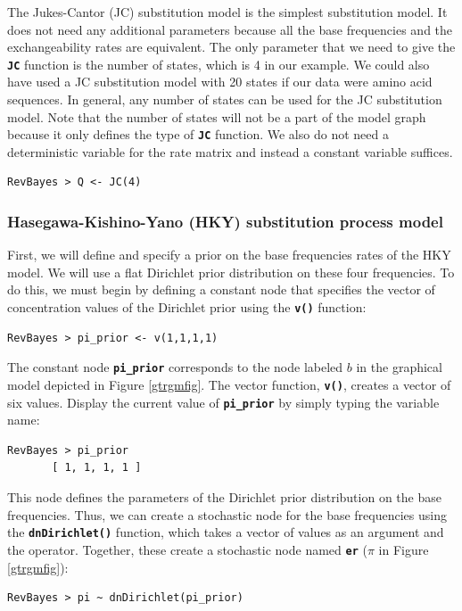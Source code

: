 \documentclass[11pt]{article}
\newcommand{\cl}[1]{{\texttt{\textbf{#1}}}}
\newcommand{\rbdn}{{\Large \symbol{126}}} %
\begin{document}
The Jukes-Cantor (JC) substitution model is the simplest substitution model.
It does not need any additional parameters because all the base frequencies and the exchangeability rates are equivalent.
The only parameter that we need to give the \cl{JC} function is the number of states, which is 4 in our example.
We could also have used a JC substitution model with 20 states if our data were amino acid sequences.
In general, any number of states can be used for the JC substitution model.
Note that the number of states will not be a part of the model graph because it only defines the type of \cl{JC} function.
We also do not need a deterministic variable for the rate matrix and instead a constant variable suffices. 
{\tt \begin{snugshade*}
\begin{lstlisting}
RevBayes > Q <- JC(4)
\end{lstlisting}
\end{snugshade*}}


\subsubsection*{Hasegawa-Kishino-Yano (HKY)  substitution process model}


First, we will define and specify a prior on the base frequencies rates of the HKY model. 
We will use a flat Dirichlet prior distribution on these four frequencies. 
To do this, we must begin by defining a constant node that specifies the vector of concentration values of the Dirichlet prior using the \cl{v()} function:
{\tt \begin{snugshade*}
\begin{lstlisting}
RevBayes > pi_prior <- v(1,1,1,1) 
\end{lstlisting}
\end{snugshade*}}


The constant node \cl{pi\_prior} corresponds to the node labeled $b$ in the graphical model depicted in Figure \ref{gtrgmfig}. 
The vector function, \cl{v()}, creates a vector of six values. 
Display the current value of \cl{pi\_prior} by simply typing the variable name:
{\tt \begin{snugshade*}
\begin{lstlisting}
RevBayes > pi_prior
       [ 1, 1, 1, 1 ]
\end{lstlisting}
\end{snugshade*}}
This node defines the parameters of the Dirichlet prior distribution on the base frequencies.
Thus, we can create a stochastic node for the base frequencies using the \cl{dnDirichlet()} function, which takes a vector of values as an argument and the \cl{\rbdn} operator. 
Together, these create a stochastic node named \cl{er} ($\pi$ in Figure \ref{gtrgmfig}): 
{\tt \begin{snugshade*}
\begin{lstlisting}
RevBayes > pi ~ dnDirichlet(pi_prior)
\end{lstlisting}
\end{snugshade*}}
\end{document}
